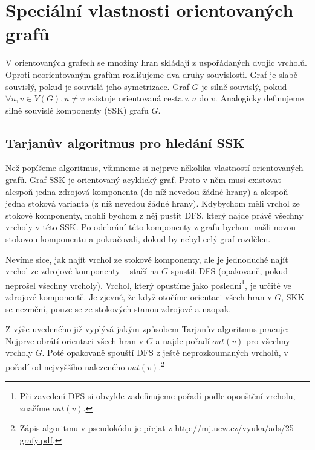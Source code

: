 \section{Speciální vlastnosti orientovaných grafů}

V orientovaných grafech se množiny hran skládají z uspořádaných dvojic vrcholů.
Oproti neorientovaným grafům rozlišujeme dva druhy souvislosti. Graf je slabě
souvislý, pokud je souvislá jeho symetrizace. Graf $G$ je silně souvislý, pokud
$\forall u,v \in V(G), u\neq v$ existuje orientovaná cesta z $u$ do $v$.
Analogicky definujeme silně souvislé komponenty (SSK) grafu $G$.

\subsection{Tarjanův algoritmus pro hledání SSK}

Než popíšeme algoritmus, všimneme si nejprve několika vlastností orientovaných grafů. Graf SSK je orientovaný acyklický graf. Proto v něm musí existovat alespoň jedna zdrojová komponenta (do níž nevedou žádné hrany) a alespoň jedna stoková varianta (z níž nevedou žádné hrany). Kdybychom měli vrchol ze stokové komponenty, mohli bychom z něj pustit DFS, který najde právě všechny vrcholy v této SSK. Po odebrání této komponenty z grafu bychom našli novou stokovou komponentu a pokračovali, dokud by nebyl celý graf rozdělen.

Nevíme sice, jak najít vrchol ze stokové komponenty, ale je jednoduché najít vrchol ze zdrojové komponenty -- stačí na $G$ spustit DFS (opakovaně, pokud neprošel všechny vrcholy). Vrchol, který opustíme jako poslední\footnote{Při zavedení DFS si obvykle zadefinujeme pořadí podle opouštění vrcholu, značíme $out(v)$.}, je určitě ve zdrojové komponentě. Je zjevné, že když otočíme orientaci všech hran v $G$, SKK se nezmění, pouze se ze stokových stanou zdrojové a naopak.


Z výše uvedeného již vyplývá jakým způsobem Tarjanův algoritmus pracuje: Nejprve obrátí orientaci všech hran v $G$ a najde pořadí $out(v)$ pro všechny vrcholy $G$. Poté opakovaně spouští DFS z ještě neprozkoumaných vrcholů, v pořadí od nejvyššího nalezeného $out(v)$.\footnote{Zápis algoritmu v pseudokódu je přejat z \url{http://mj.ucw.cz/vyuka/ads/25-grafy.pdf}.}

